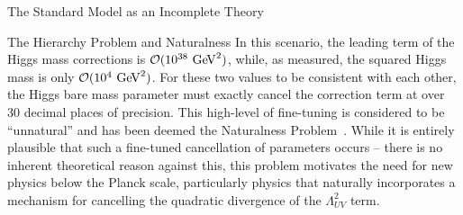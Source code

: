 \begin{section}{The Standard Model as an Incomplete Theory}
\begin{subsection}{The Hierarchy Problem and Naturalness}
In this scenario, the leading term of the Higgs mass corrections is $\mathcal{O}(10^{38}~\mathrm{Ge\kern -0.1em V}^2)$, while, as measured, the squared Higgs mass is only $\mathcal{O}(10^{4}~\mathrm{Ge\kern -0.1em V}^2)$.
For these two values to be consistent with each other, the Higgs bare mass parameter must exactly cancel the correction term at over 30 decimal places of precision.
This high-level of fine-tuning is considered to be ``unnatural'' and has been deemed the Naturalness Problem~\cite{Feng:2013pwa,Craig:2013cxa,Papucci:2011wy,Casas:2014eca}.
While it is entirely plausible that such a fine-tuned cancellation of parameters occurs -- there is no inherent theoretical reason against this, this problem motivates the need for new physics below the Planck scale, particularly physics that naturally incorporates a mechanism for cancelling the quadratic divergence of the $\Lambda_{UV}^2$ term.

\end{subsection}

\end{section}
